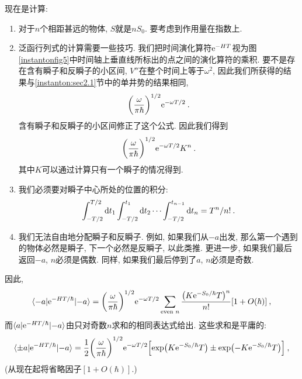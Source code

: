 现在是计算:
\begin{enumerate}
    \item 对于$n$个相距甚远的物体, $S$就是$n S_{0}$. 要考虑到作用量在指数上.
    \item 泛函行列式的计算需要一些技巧. 我们把时间演化算符$\mathrm{e}^{-HT}$视为图\ref{instantonfig5}中时间轴上垂直线所标出的点之间的演化算符的乘积. 
    要不是存在含有瞬子和反瞬子的小区间, $V''$在整个时间上等于$\omega^{2}$, 因此我们所获得的结果与\ref{instanton:sec2.1}节中的单井势的结果相同, 
    \begin{equation}
        \biggl(\frac{\omega}{\pi\hbar}\biggr)^{1/2} \mathrm{e}^{-\omega T/2} \:. \label{instanton2.26}
    \end{equation}
    含有瞬子和反瞬子的小区间修正了这个公式. 因此我们得到
    \begin{equation}
        \biggl(\frac{\omega}{\pi\hbar}\biggr)^{1/2} \mathrm{e}^{-\omega T/2}K^{n} \:. \label{instanton2.27}
    \end{equation}
    其中$K$可以通过计算只有一个瞬子的情况得到.
    \item 我们必须要对瞬子中心所处的位置的积分:
    \begin{equation}
        \int_{-T/2}^{T/2} \mathrm{d} t_{1}\int_{-T/2}^{t_{1}} \mathrm{d} t_{2} \cdots \int_{-T/2}^{t_{n-1}} \mathrm{d} t_{n} 
        =T^{n}/n! \:. \label{instaton2.28}
    \end{equation}
    \item 我们无法自由地分配瞬子和反瞬子. 例如, 如果我们从${-}a$出发, 那么第一个遇到的物体必然是瞬子, 下一个必然是反瞬子, 以此类推. 
    更进一步, 如果我们最后返回${-}a$, $n$必须是偶数. 同样, 如果我们最后停到了$a$, $n$必须是奇数. 
\end{enumerate}

因此,
\begin{equation}
    \langle{-}a\vert \mathrm{e}^{-HT/\hbar} \vert {-a}\rangle 
    =\biggl(\frac{\omega}{\pi\hbar}\biggr)^{1/2} \mathrm{e}^{-\omega T/2} 
    \sum_{\text{even }n} \frac{\bigl(K\mathrm{e}^{-S_{0}/\hbar}T\bigr)^{n}}{n!}[1+O(\hbar)] \:, \label{instanton2.29}
\end{equation}
而$\langle a\vert \mathrm{e}^{-HT/\hbar} \vert {-a}\rangle $由只对奇数$n$求和的相同表达式给出. 这些求和是平庸的:
\begin{equation}
    \langle \pm a\vert \mathrm{e}^{-HT/\hbar} \vert {-a}\rangle 
    =\frac{1}{2}\biggl(\frac{\omega}{\pi\hbar}\biggr)^{1/2} \mathrm{e}^{-\omega T/2}
    \Bigl[\exp\bigl(K\mathrm{e}^{-S_{0}/\hbar}T\bigr)\pm \exp\bigl(-K\mathrm{e}^{-S_{0}/\hbar}T\bigr)\Bigr] 
    \:, \label{instanton2.30}
\end{equation}
(从现在起将省略因子$[1+O(\hbar)]$.)


